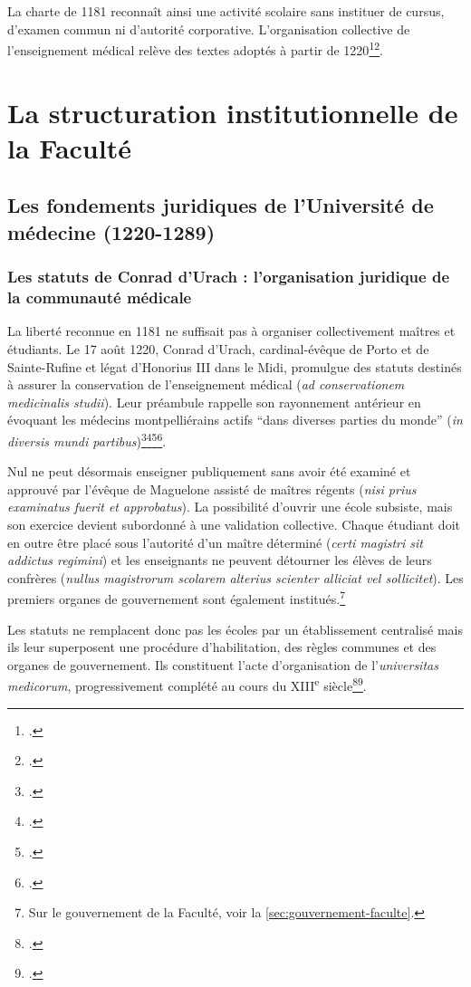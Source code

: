 La charte de 1181 reconnaît ainsi une activité scolaire sans instituer de cursus, d'examen commun ni d'autorité corporative. L'organisation collective de l'enseignement médical relève des textes adoptés à partir de 1220\footcite{Verger2021}\footcite{LavabreBertrand2020}.

\section{La structuration institutionnelle de la Faculté}

\subsection{Les fondements juridiques de l'Université de médecine (1220-1289)}

\subsubsection{Les statuts de Conrad d'Urach : l'organisation juridique de la communauté médicale}

La liberté reconnue en 1181 ne suffisait pas à organiser collectivement maîtres et étudiants. Le 17 août 1220, Conrad d'Urach, cardinal-évêque de Porto et de Sainte-Rufine et légat d'Honorius III dans le Midi, promulgue des statuts destinés à assurer la conservation de l'enseignement médical (\emph{ad conservationem medicinalis studii}). Leur préambule rappelle son rayonnement antérieur en évoquant les médecins montpelliérains actifs \enquote{dans diverses parties du monde} (\emph{in diversis mundi partibus})\footcite[fol.~187--188, vues~186--187/348]{ADHG1126}\footcite{Conrad1220}\footcite{Verger2021}\footcite{LavabreBertrand2020}.

Nul ne peut désormais enseigner publiquement sans avoir été examiné et approuvé par l'évêque de Maguelone assisté de maîtres régents (\emph{nisi prius examinatus fuerit et approbatus}). La possibilité d'ouvrir une école subsiste, mais son exercice devient subordonné à une validation collective. Chaque étudiant doit en outre être placé sous l'autorité d'un maître déterminé (\emph{certi magistri sit addictus regimini}) et les enseignants ne peuvent détourner les élèves de leurs confrères (\emph{nullus magistrorum scolarem alterius scienter alliciat vel sollicitet}). Les premiers organes de gouvernement sont également institués.\footnote{Sur le gouvernement de la Faculté, voir la \cref{sec:gouvernement-faculte}.}

Les statuts ne remplacent donc pas les écoles par un établissement centralisé mais ils leur superposent une procédure d'habilitation, des règles communes et des organes de gouvernement. Ils constituent l'acte d'organisation de l'\emph{universitas medicorum}, progressivement complété au cours du XIII\textsuperscript{e} siècle\footcite{Verger2021}\footcite{Moulinier2003Montpellier}.

